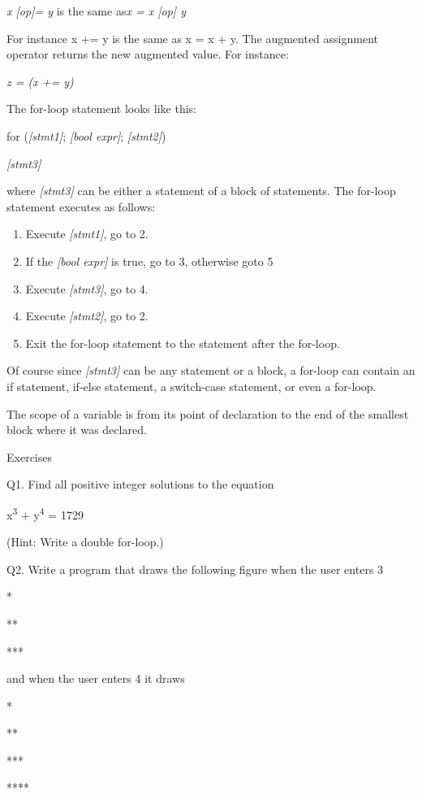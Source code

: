 \documentclass[
]{article}
\providecommand{\tightlist}{%
  \setlength{\itemsep}{0pt}\setlength{\parskip}{0pt}}
\begin{document}
\emph{x {[}op{]}= y }is the same as\emph{x = x {[}op{]} y}

For instance x += y is the same as x = x + y. The augmented assignment
operator returns the new augmented value. For instance:

\emph{z = (x += y)}

The for-loop statement looks like this:

for (\emph{{[}stmt1{]}}; \emph{{[}bool expr{]}}; \emph{{[}stmt2{]}})

\emph{{[}stmt3{]}}

where \emph{{[}stmt3{]}} can be either a statement of a block of
statements. The for-loop statement executes as follows:

\begin{enumerate}
\def\labelenumi{\arabic{enumi}.}
\tightlist
\item
  Execute \emph{{[}stmt1{]}}, go to 2.
\item
  If the \emph{{[}bool expr{]}} is true, go to 3, otherwise goto 5
\item
  Execute \emph{{[}stmt3{]}}, go to 4.
\item
  Execute \emph{{[}stmt2{]}}, go to 2.
\item
  Exit the for-loop statement to the statement after the for-loop.
\end{enumerate}

Of course since \emph{{[}stmt3{]}} can be any statement or a block, a
for-loop can contain an if statement, if-else statement, a switch-case
statement, or even a for-loop.

The scope of a variable is from its point of declaration to the end of
the smallest block where it was declared.

Exercises

Q1. Find all positive integer solutions to the equation

x\textsuperscript{3} + y\textsuperscript{4} = 1729

(Hint: Write a double for-loop.)

Q2. Write a program that draws the following figure when the user enters
3

*

**

***

and when the user enters 4 it draws

*

**

***

****
\end{document}
